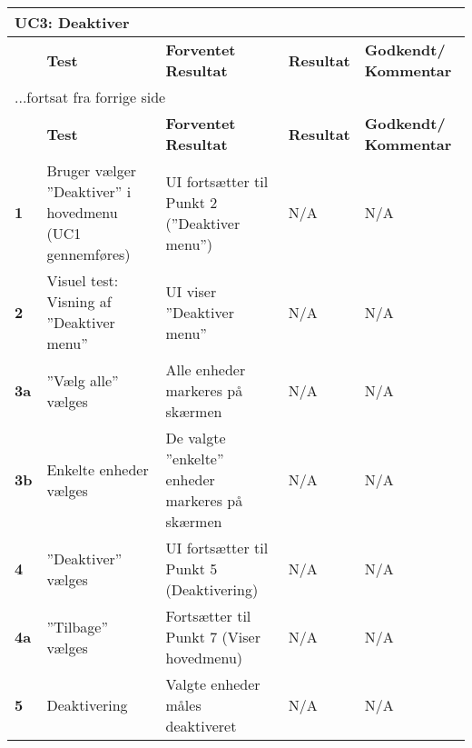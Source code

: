 
\begin{center}
\begin{longtable}{|p{}|p{}|p{}|p{}|p{}|} %
\hline
\multicolumn{5}{|l|}{\textbf{UC3: Deaktiver}} \\ \hline
\multicolumn{1}{|c|}{} &
\textbf{Test} &
\textbf{Forventet \newline Resultat} &
\textbf{Resultat} &
\textbf{Godkendt/ \newline Kommentar} \\ \hline 
\endfirsthead

\multicolumn{5}{l}{...fortsat fra forrige side} \\ \hline 
\multicolumn{1}{|c|}{} &
\textbf{Test} &
\textbf{Forventet \newline Resultat} &
\textbf{Resultat} &
\textbf{Godkendt/ \newline Kommentar} \\ \hline 
\endhead


		
\textbf{1}			&Bruger vælger ''Deaktiver'' i hovedmenu (UC1 gennemføres)															
					&UI fortsætter til Punkt 2 (''Deaktiver menu'')
					&N/A 
					&N/A \\\hline
					
\textbf{2}			&Visuel test: Visning af ''Deaktiver menu''																
					&UI viser ''Deaktiver menu''
					&N/A 
					&N/A \\\hline
		
\textbf{3a}			&''Vælg alle'' vælges		
					&Alle enheder markeres på skærmen		 	
					&N/A 
					&N/A \\\hline

\textbf{3b}			&Enkelte enheder vælges
					&De valgte ''enkelte'' enheder markeres på skærmen
					&N/A 
					&N/A \\\hline

\textbf{4}			&''Deaktiver'' vælges			
					&UI fortsætter til Punkt 5 (Deaktivering)
					&N/A 
					&N/A \\\hline
					
\textbf{4a}			&''Tilbage'' vælges			
					&Fortsætter til Punkt 7 (Viser hovedmenu)
					&N/A 
					&N/A \\\hline

\textbf{5}			&Deaktivering			
					&Valgte enheder måles deaktiveret
					&N/A 
					&N/A \\\hline
															

\end{longtable}
\end{center}
